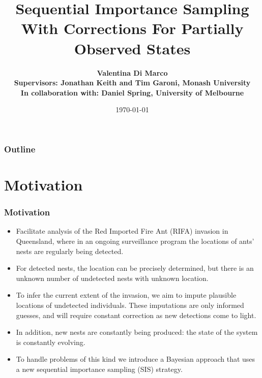 \documentclass[9pt]{beamer}
\title{Sequential Importance Sampling With Corrections For Partially Observed States}
\author[Valentina Di Marco]{\textbf {Valentina Di Marco\\ \footnotesize Supervisors: Jonathan Keith and Tim Garoni, Monash University\\ \footnotesize In collaboration with: Daniel Spring, University of Melbourne}}
\institute{Monash University}
\date{\today}
\begin{document}
\begin{frame}
\titlepage
\end{frame}

\begin{frame}
\frametitle{Outline}
\tableofcontents
\end{frame}

\section{Motivation}

\begin{frame}
\frametitle{Motivation}
\begin{itemize}
\setlength\itemsep{1em}
    \item Facilitate analysis of the Red Imported Fire Ant (RIFA) invasion in Queensland, where in an ongoing surveillance program the locations of ants’ nests are regularly being detected.
    \item For detected nests, the location can be precisely determined, but there is an unknown number of undetected nests with unknown location. 
    \item To infer the current extent of the invasion, we aim to impute plausible locations of undetected individuals. These imputations are only informed guesses, and will require constant correction as new detections come to light. \item In addition, new nests are constantly being produced: the state of the system is constantly evolving.
    \item To handle problems of this kind we introduce a Bayesian approach that uses a new sequential importance sampling (SIS) strategy.
\end{itemize}
\end{frame}
\end{document}

